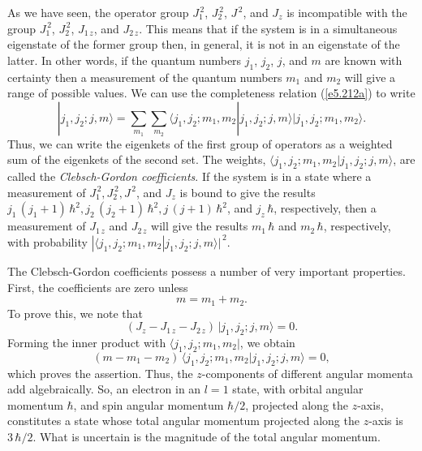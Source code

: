 As we have seen, the operator group $J_1^{\,2}$, $J_2^{\,2}$, $J^{\,2}$, and $J_z$
is incompatible with the group $J_1^{\,2}$, $J_2^{\,2}$, $J_{1\,z}$, and $J_{2\,z}$.
This means that if the system is in a simultaneous eigenstate of the former group
then, in general, it is not in an eigenstate of the latter. In other words,
if the quantum numbers $j_1$, $j_2$, $j$, and $m$ are known with
certainty then a measurement of the quantum numbers $m_1$ and $m_2$ will
give a range of possible values. We can use the completeness relation
(\ref{e5.212a}) to write
\begin{equation}
|j_1,j_2;j,m\rangle = \sum_{m_1}\sum_{m_2} \langle j_1,j_2;m_1,m_2|j_1,j_2;j,m\rangle
|j_1,j_2;m_1,m_2\rangle.
\end{equation}
Thus, we can write the eigenkets of the first group of operators
as a weighted sum of the eigenkets of the second set. The weights,
$\langle j_1,j_2;m_1,m_2|j_1,j_2;j,m\rangle$, are called the {\em Clebsch-Gordon
coefficients}. If the system is in a state where a measurement of
$J_1^{\,2}, J_2^{\,2}, J^{\,2}$, and $J_z$ is bound to give the results
$j_1\,(j_1+1)\,\hbar^2, j_2\,(j_2+1)\,\hbar^2, j\,(j+1)\,\hbar^2$,
and $j_z\,\hbar$, respectively, then a measurement of $J_{1\,z}$ and $J_{2\,z}$
will give the results $m_1\,\hbar$ and $m_2\,\hbar$, respectively,  with
probability $|\langle j_1,j_2;m_1,m_2|j_1,j_2;j,m\rangle|^{\,2}$. 

The Clebsch-Gordon coefficients possess a number of very important properties.
First, the coefficients are zero unless
\begin{equation}\label{e5.214}
m = m_1 + m_2.
\end{equation}
To prove this, we note that
\begin{equation}
(J_z - J_{1\,z} - J_{2\,z})\, |j_1,j_2; j, m\rangle =0.
\end{equation}
Forming the inner product with $\langle j_1, j_2; m_1, m_2|$, we obtain
\begin{equation}
(m-m_1-m_2) \,\langle j_1, j_2; m_1, m_2|j_1,j_2; j, m\rangle=0,
\end{equation}
which proves the assertion. Thus, the $z$-components of different angular momenta
add algebraically. So, an electron in an $l=1$ state, with orbital
angular momentum $\hbar$, and spin angular momentum $\hbar/2$, projected along the
$z$-axis,  constitutes a state whose total angular momentum projected
along the $z$-axis is $3\,\hbar/2$. What is uncertain is the magnitude of the
total angular momentum. 

